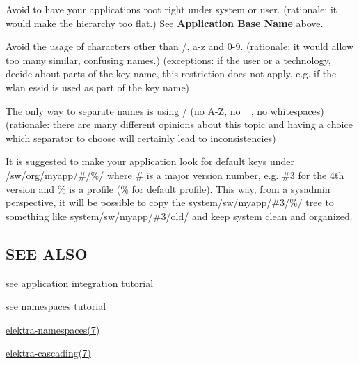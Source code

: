 \begin{DoxyItemize}
\item Avoid to have your applications root right under {\ttfamily system} or {\ttfamily user}. (rationale\+: it would make the hierarchy too flat.) See {\bfseries Application Base Name} above.
\item Avoid the usage of characters other than {\ttfamily /}, a-\/z and 0-\/9. (rationale\+: it would allow too many similar, confusing names.) (exceptions\+: if the user or a technology, decide about parts of the key name, this restriction does not apply, e.\+g. if the wlan essid is used as part of the key name)
\item The only way to separate names is using {\ttfamily /} (no A-\/\+Z, no {\ttfamily \+\_\+}, no whitespaces) (rationale\+: there are many different opinions about this topic and having a choice which separator to choose will certainly lead to inconsistencies)
\item It is suggested to make your application look for default keys under {\ttfamily /sw/org/myapp/\#/\%/} where {\ttfamily \#} is a major version number, e.\+g. {\ttfamily \#3} for the 4th version and {\ttfamily \%} is a profile ({\ttfamily \%} for default profile). This way, from a sysadmin perspective, it will be possible to copy the {\ttfamily system/sw/myapp/\#3/\%/} tree to something like {\ttfamily system/sw/myapp/\#3/old/} and keep system clean and organized.
\end{DoxyItemize}

\subsection*{S\+E\+E A\+L\+S\+O}


\begin{DoxyItemize}
\item \hyperlink{doc_tutorials_application-integration_md}{see application integration tutorial}
\item \hyperlink{doc_tutorials_namespaces_md}{see namespaces tutorial}
\item \hyperlink{md_doc_help_elektra-namespaces_doc_help_elektra-namespaces_md}{elektra-\/namespaces(7)}
\item \hyperlink{md_doc_help_elektra-cascading_doc_help_elektra-cascading_md}{elektra-\/cascading(7)} 
\end{DoxyItemize}
